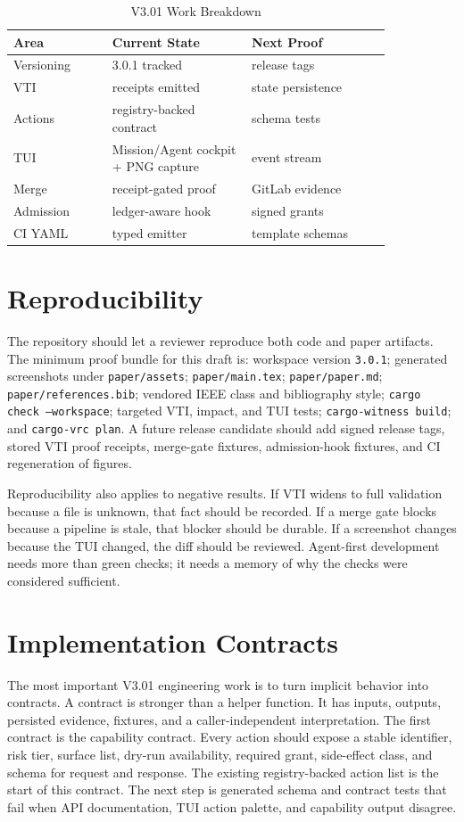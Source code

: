 \documentclass[conference]{IEEEtran}
\begin{document}
\begin{table}[t]
\caption{V3.01 Work Breakdown}
\centering
\footnotesize
\begin{tabular}{p{0.22\linewidth}p{0.31\linewidth}p{0.31\linewidth}}
\toprule
Area & Current State & Next Proof\\
\midrule
Versioning & 3.0.1 tracked & release tags\\
VTI & receipts emitted & state persistence\\
Actions & registry-backed contract & schema tests\\
TUI & Mission/Agent cockpit + PNG capture & event stream\\
Merge & receipt-gated proof & GitLab evidence\\
Admission & ledger-aware hook & signed grants\\
CI YAML & typed emitter & template schemas\\
\bottomrule
\end{tabular}
\end{table}

\section{Reproducibility}
The repository should let a reviewer reproduce both code and paper artifacts. The minimum proof bundle for this draft is: workspace version \texttt{3.0.1}; generated screenshots under \texttt{paper/assets}; \texttt{paper/main.tex}; \texttt{paper/paper.md}; \texttt{paper/references.bib}; vendored IEEE class and bibliography style; \texttt{cargo check --workspace}; targeted VTI, impact, and TUI tests; \texttt{cargo-witness build}; and \texttt{cargo-vrc plan}. A future release candidate should add signed release tags, stored VTI proof receipts, merge-gate fixtures, admission-hook fixtures, and CI regeneration of figures.

Reproducibility also applies to negative results. If VTI widens to full validation because a file is unknown, that fact should be recorded. If a merge gate blocks because a pipeline is stale, that blocker should be durable. If a screenshot changes because the TUI changed, the diff should be reviewed. Agent-first development needs more than green checks; it needs a memory of why the checks were considered sufficient.

\section{Implementation Contracts}
The most important V3.01 engineering work is to turn implicit behavior into contracts. A contract is stronger than a helper function. It has inputs, outputs, persisted evidence, fixtures, and a caller-independent interpretation. The first contract is the capability contract. Every action should expose a stable identifier, risk tier, surface list, dry-run availability, required grant, side-effect class, and schema for request and response. The existing registry-backed action list is the start of this contract. The next step is generated schema and contract tests that fail when API documentation, TUI action palette, and capability output disagree.
\end{document}
